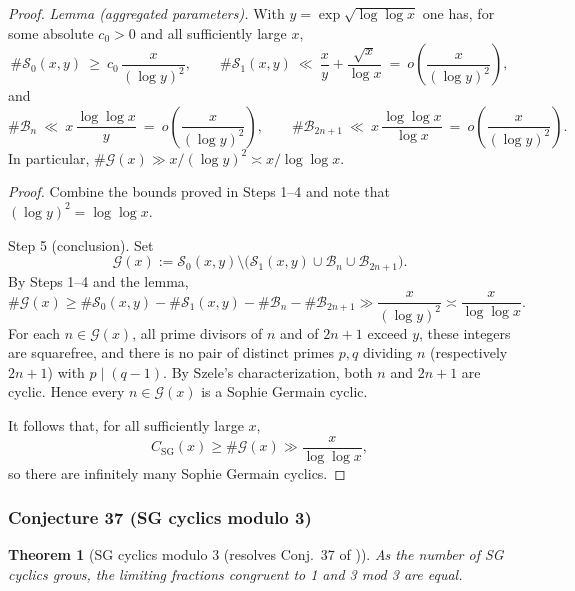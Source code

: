 \documentclass[12pt]{article}
\newtheorem{theorem}{Theorem}
\theoremstyle{remark}
\begin{document}
\begin{proof}
\medskip
\noindent\textit{Lemma (aggregated parameters).} With $y=\exp\sqrt{\log\log x}$ one has, for some absolute $c_0>0$ and all sufficiently large $x$,
\[
 \#\mathcal S_0(x,y)\ \ge\ c_0\,\frac{x}{(\log y)^2},\qquad
 \#\mathcal S_1(x,y)\ \ll\ \frac{x}{y}+\frac{\sqrt{x}}{\log x}\ =\ o\!\left(\frac{x}{(\log y)^2}\right),
\]
and
\[
 \#\mathcal B_n\ \ll\ x\,\frac{\log\log x}{y}\ =\ o\!\left(\frac{x}{(\log y)^2}\right),\qquad
 \#\mathcal B_{2n+1}\ \ll\ x\,\frac{\log\log x}{\log x}\ =\ o\!\left(\frac{x}{(\log y)^2}\right).
\]
In particular, $\#\mathcal G(x)\gg x/(\log y)^2\asymp x/\log\log x$.

\noindent\textit{Proof.} Combine the bounds proved in Steps 1--4 and note that $(\log y)^2=\log\log x$.

Step 5 (conclusion). Set
$$\mathcal G(x):=\mathcal S_0(x,y)\setminus\bigl(\mathcal S_1(x,y)\cup\mathcal B_n\cup\mathcal B_{2n+1}\bigr).$$
By Steps 1--4 and the lemma,
$$\#\mathcal G(x)\ge \#\mathcal S_0(x,y)-\#\mathcal S_1(x,y)-\#\mathcal B_n-\#\mathcal B_{2n+1}\gg \frac{x}{(\log y)^2}\asymp \frac{x}{\log\log x}.$$
For each $n\in\mathcal G(x)$, all prime divisors of $n$ and of $2n+1$ exceed $y$, these integers are squarefree, and there is no pair of distinct primes $p,q$ dividing $n$ (respectively $2n+1$) with $p\mid(q-1)$. By Szele's characterization, both $n$ and $2n+1$ are cyclic. Hence every $n\in\mathcal G(x)$ is a Sophie Germain cyclic.

It follows that, for all sufficiently large $x$,
$$C_{\mathrm{SG}}(x)\ge \#\mathcal G(x)\gg \frac{x}{\log\log x},$$
so there are infinitely many Sophie Germain cyclics. 
\end{proof}


\subsubsection{Conjecture 37 (SG cyclics modulo 3)}
\begin{theorem}[SG cyclics modulo 3 (resolves Conj.~37 of \cite{Cohen2025})]\label{thm:sg_cyclics_modulo_3}
As the number of SG cyclics grows, the limiting fractions congruent to 1 and 3 mod 3 are equal.
\end{theorem}
\end{document}

